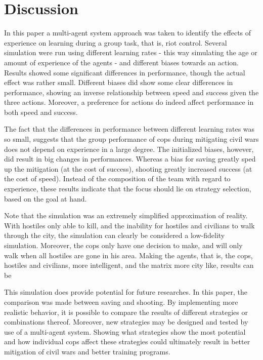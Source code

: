 \section{Discussion}
In this paper a multi-agent system approach was taken to identify the effects of experience on learning during a group task, that is, riot control. Several simulation were run using different learning rates - this way simulating the age or amount of experience of the agents - and different biases towards an action. Results showed some significant differences in performance, though the actual effect was rather small. Different biases did show some clear differences in performance, showing an inverse relationship between speed and success given the three actions. Moreover, a preference for actions do indeed affect performance in both speed and success. 

The fact that the differences in performance between different learning rates was so small, suggests that the group performance of cops during mitigating civil wars does not depend on experience in a large degree. The initialized biases, however, did result in big changes in performances. Whereas a bias for saving greatly sped up the mitigation (at the cost of success), shooting greatly increased success (at the cost of speed). Instead of the composition of the team with regard to experience, these results indicate that the focus should lie on strategy selection, based on the goal at hand. 

Note that the simulation was an extremely simplified approximation of reality. With hostiles only able to kill, and the inability for hostiles and civilians to walk through the city, the simulation can clearly be considered a low-fidelity simulation. Moreover, the cops only have one decision to make, and will only walk when all hostiles are gone in his area. Making the agents, that is, the cops, hostiles and civilians, more intelligent, and the matrix more city like, results can be 

This simulation does provide potential for future researches. In this paper, the comparison was made between saving and shooting. By implementing more realistic behavior, it is possible to compare the results of different strategies or combinations thereof. Moreover, new strategies may be designed and tested by use of a multi-agent system. Showing what strategies show the most potential and how individual cops affect these strategies could ultimately result in better mitigation of civil wars and better training programs. 

